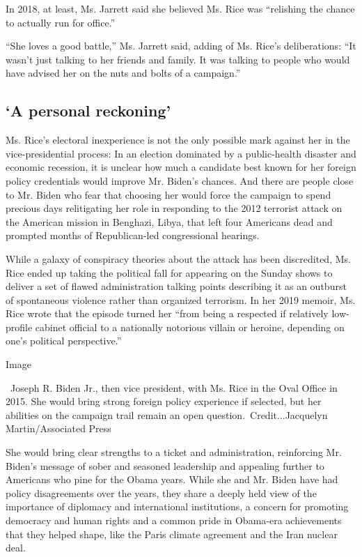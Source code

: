 In 2018, at least, Ms. Jarrett said she believed Ms. Rice was
``relishing the chance to actually run for office.''

``She loves a good battle,'' Ms. Jarrett said, adding of Ms. Rice's
deliberations: ``It wasn't just talking to her friends and family. It
was talking to people who would have advised her on the nuts and bolts
of a campaign.''

\hypertarget{a-personal-reckoning}{%
\subsection{`A personal reckoning'}\label{a-personal-reckoning}}

Ms. Rice's electoral inexperience is not the only possible mark against
her in the vice-presidential process: In an election dominated by a
public-health disaster and economic recession, it is unclear how much a
candidate best known for her foreign policy credentials would improve
Mr. Biden's chances. And there are people close to Mr. Biden who fear
that choosing her would force the campaign to spend precious days
relitigating her role in responding to the 2012 terrorist attack on the
American mission in Benghazi, Libya, that left four Americans dead and
prompted months of Republican-led congressional hearings.

While a galaxy of conspiracy theories about the attack has been
discredited, Ms. Rice ended up taking the political fall for appearing
on the Sunday shows to deliver a set of flawed administration talking
points describing it as an outburst of spontaneous violence rather than
organized terrorism. In her 2019 memoir, Ms. Rice wrote that the episode
turned her ``from being a respected if relatively low-profile cabinet
official to a nationally notorious villain or heroine, depending on
one's political perspective.''

Image

~Joseph R. Biden Jr., then vice president, with Ms. Rice in the Oval
Office in 2015. She would bring strong foreign policy experience if
selected, but her abilities on the campaign trail remain an open
question.~Credit...Jacquelyn Martin/Associated Press

She would bring clear strengths to a ticket and administration,
reinforcing Mr. Biden's message of sober and seasoned leadership and
appealing further to Americans who pine for the Obama years. While she
and Mr. Biden have had policy disagreements over the years, they share a
deeply held view of the importance of diplomacy and international
institutions, a concern for promoting democracy and human rights and a
common pride in Obama-era achievements that they helped shape, like the
Paris climate agreement and the Iran nuclear deal.

